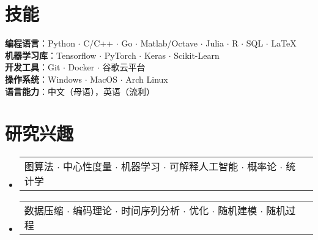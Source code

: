 \documentclass[UTF8,10pt]{ctexart}
\makeatletter
\newcommand{\resumeProjectHeading}[2]{
  \item
  \begin{tabular*}{0.97\textwidth}{l@{\extracolsep{\fill}}r}
    \small#1 & #2 \\
  \end{tabular*}\vspace{-7pt}
}
\newenvironment{resumeSubHeadingList}{\begin{itemize}[leftmargin=0.15in, label={}]}{\end{itemize}}
\makeatother
\begin{document}
\section{技能}
\begin{itemize}[leftmargin=0.15in, label={}]
  \small{\item{
        \textbf{编程语言}{：Python $\cdot$ C/C++ $\cdot$ Go $\cdot$ Matlab/Octave $\cdot$ Julia $\cdot$ R $\cdot$ SQL $\cdot$ \LaTeX} \\
        \textbf{机器学习库}{：Tensorflow $\cdot$  PyTorch $\cdot$ Keras $\cdot$  Scikit-Learn} \\
        \textbf{开发工具}{：Git $\cdot$ Docker $\cdot$  谷歌云平台} \\
        \textbf{操作系统}{：Windows $\cdot$ MacOS $\cdot$ Arch Linux} \\
        \textbf{语言能力}{：中文（母语），英语（流利）}
        }}
\end{itemize}

\section{研究兴趣}
\begin{resumeSubHeadingList}
  \resumeProjectHeading{
    图算法 $\cdot$ 中心性度量 $\cdot$ 机器学习
    $\cdot$ 可解释人工智能 $\cdot$ 概率论
    $\cdot$ 统计学}{}
  \resumeProjectHeading{
    数据压缩 $\cdot$ 编码理论 $\cdot$ 时间序列分析 $\cdot$
    优化 $\cdot$ 随机建模 $\cdot$ 随机过程}{}
\end{resumeSubHeadingList}
\end{document}
